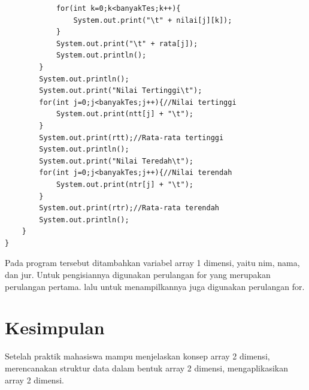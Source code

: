 \documentclass[a4paper,12pt]{article}
\begin{document}
\begin{lstlisting}
            for(int k=0;k<banyakTes;k++){
                System.out.print("\t" + nilai[j][k]);
            }
            System.out.print("\t" + rata[j]);
            System.out.println();
        }
        System.out.println();
        System.out.print("Nilai Tertinggi\t");
        for(int j=0;j<banyakTes;j++){//Nilai tertinggi
            System.out.print(ntt[j] + "\t");
        }
        System.out.print(rtt);//Rata-rata tertinggi
        System.out.println();
        System.out.print("Nilai Teredah\t");
        for(int j=0;j<banyakTes;j++){//Nilai terendah
            System.out.print(ntr[j] + "\t");
        }
        System.out.print(rtr);//Rata-rata terendah
        System.out.println();
    }
}
\end{lstlisting}
Pada program tersebut ditambahkan variabel array 1 dimensi, yaitu nim, nama, dan jur. Untuk pengisiannya digunakan perulangan for yang merupakan perulangan pertama.
lalu untuk menampilkannya juga digunakan perulangan for.

\newpage

\section{Kesimpulan}
Setelah praktik mahasiswa mampu menjelaskan konsep array 2 dimensi, merencanakan struktur data dalam bentuk array 2 dimensi, mengaplikasikan array 2 dimensi.
\end{document}
